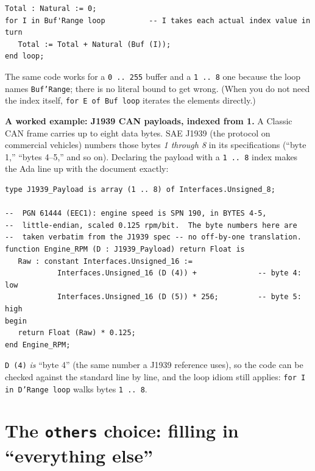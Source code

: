 \begin{lstlisting}
Total : Natural := 0;
for I in Buf'Range loop          -- I takes each actual index value in turn
   Total := Total + Natural (Buf (I));
end loop;
\end{lstlisting}

The same code works for a \texttt{0\,..\,255} buffer and a \texttt{1\,..\,8} one
because the loop names \texttt{Buf'Range}; there is no literal bound to get
wrong. (When you do not need the index itself, \texttt{for E of Buf loop}
iterates the elements directly.)

\textbf{A worked example: J1939 CAN payloads, indexed from 1.} A Classic CAN
frame carries up to eight data bytes. SAE J1939 (the protocol on commercial
vehicles) numbers those bytes \emph{1 through 8} in its specifications
(``byte 1,'' ``bytes 4--5,'' and so on). Declaring the payload with a
\texttt{1\,..\,8} index makes the Ada line up with the document exactly:

\begin{lstlisting}
type J1939_Payload is array (1 .. 8) of Interfaces.Unsigned_8;

--  PGN 61444 (EEC1): engine speed is SPN 190, in BYTES 4-5,
--  little-endian, scaled 0.125 rpm/bit.  The byte numbers here are
--  taken verbatim from the J1939 spec -- no off-by-one translation.
function Engine_RPM (D : J1939_Payload) return Float is
   Raw : constant Interfaces.Unsigned_16 :=
            Interfaces.Unsigned_16 (D (4)) +              -- byte 4: low
            Interfaces.Unsigned_16 (D (5)) * 256;         -- byte 5: high
begin
   return Float (Raw) * 0.125;
end Engine_RPM;
\end{lstlisting}

\texttt{D (4)} \emph{is} ``byte 4'' (the same number a J1939 reference uses),
so the code can be checked against the standard line by line, and the loop idiom
still applies: \texttt{for I in D'Range loop} walks bytes \texttt{1\,..\,8}.


\section{The \texttt{others} choice: filling in ``everything else''}
\label{sec:others}

